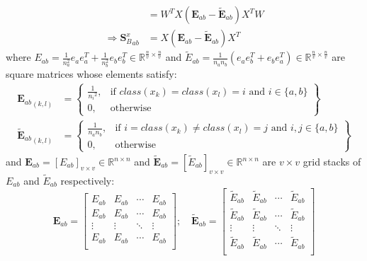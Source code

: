\begin{appendix}
\begin{equation}
\begin{split}
            &= W^T X \left(\boldsymbol{E}_{ab} - \boldsymbol{\tilde{E}}_{ab}\right) X^T W \\
        \Rightarrow {\boldsymbol{S}_B^x}_{ab} &= X \left(\boldsymbol{E}_{ab} - \boldsymbol{\tilde{E}}_{ab}\right) X^T
        \end{split}
        \label{eq:pcmvda_Sb_i_derivation}
    \end{equation}
    where $E_{ab} = \frac{1}{n_a^2}e_a e_a^T + \frac{1}{n_b^2}e_b e_b^T \in \mathbb{R}^{\frac{n}{v}\times \frac{n}{v}}$ and $\tilde{E}_{ab} = \frac{1}{n_a n_b}\left(e_a e_b^T + e_b e_a^T\right) \in \mathbb{R}^{\frac{n}{v}\times \frac{n}{v}}$ are square matrices whose elements satisfy:
    \begin{align}
        {\boldsymbol{E}_{ab}}_{(k,l)} &= \left\{\begin{array}{lr}
            \frac{1}{{n_i}^2}, & \text{if } class(x_k) = class(x_l) = i \text{ and } i \in \{a, b\} \\
            0, & \text{otherwise}
            \end{array}\right\} \\
        {\boldsymbol{\tilde{E}}_{ab}}_{(k,l)} &= \left\{\begin{array}{lr}
            \frac{1}{n_a n_b}, & \text{if } i = class(x_k) \neq class(x_l) = j \text{ and } i,j \in \{a, b\} \\
            0, & \text{otherwise}
            \end{array}\right\}
    \end{align}
    and $\boldsymbol{E}_{ab} = \left[E_{ab}\right]_{v \times v} \in \mathbb{R}^{n\times n}$ and $\boldsymbol{\tilde{E}}_{ab} = \left[\tilde{E}_{ab}\right]_{v \times v} \in \mathbb{R}^{n\times n}$ are $v \times v$ grid stacks of $E_{ab}$ and $\tilde{E}_{ab}$ respectively:
    \begin{equation}
        \boldsymbol{E}_{ab} = \left[\begin{matrix}E_{ab}&E_{ab}&\cdots&E_{ab}\\E_{ab}&E_{ab}&\cdots&E_{ab}\\\vdots&\vdots&\ddots&\vdots\\E_{ab}&E_{ab}&\cdots&E_{ab}\\\end{matrix}\right]; \quad
        \boldsymbol{\tilde{E}}_{ab} = \left[\begin{matrix}\tilde{E}_{ab}&\tilde{E}_{ab}&\cdots&\tilde{E}_{ab}\\\tilde{E}_{ab}&\tilde{E}_{ab}&\cdots&\tilde{E}_{ab}\\\vdots&\vdots&\ddots&\vdots\\\tilde{E}_{ab}&\tilde{E}_{ab}&\cdots&\tilde{E}_{ab}\\\end{matrix}\right]
    \end{equation}

\normalsize
\end{appendix}
